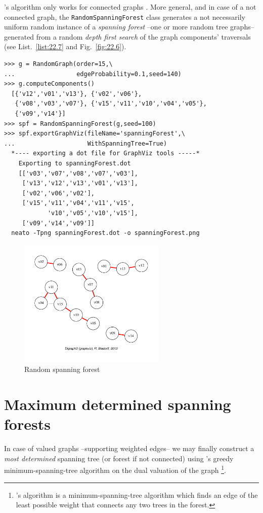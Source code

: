 \Wilson's algorithm only works for connected graphs \citep{WIL-1996}. More general, and in case of a not connected graph, the \texttt{RandomSpanningForest} class generates a not necessarily uniform random instance of a \emph{spanning forest} --one or more random tree graphs-- generated from a random \emph{depth first search} of the graph components' traversals (see List.~\vref{list:22.7} and Fig.~\vref{fig:22.6}).
\begin{lstlisting}[caption={Computing spanning forests over disconnected graphs. },label=list:22.7]
>>> g = RandomGraph(order=15,\
...                 edgeProbability=0.1,seed=140)
>>> g.computeComponents()
  [{'v12','v01','v13'}, {'v02','v06'},
   {'v08','v03','v07'}, {'v15','v11','v10','v04','v05'},
   {'v09','v14'}]
>>> spf = RandomSpanningForest(g,seed=100)
>>> spf.exportGraphViz(fileName='spanningForest',\
...                    WithSpanningTree=True)
  *---- exporting a dot file for GraphViz tools -----*
    Exporting to spanningForest.dot
    [['v03','v07','v08','v07','v03'],
     ['v13','v12','v13','v01','v13'],
     ['v02','v06','v02'],
     ['v15','v11','v04','v11','v15',
            'v10','v05','v10','v15'],
     ['v09','v14','v09']]
  neato -Tpng spanningForest.dot -o spanningForest.png
\end{lstlisting}
\begin{figure}[ht]
\sidecaption[t]
\includegraphics[width=7cm]{Figures/22-6-spanningForest.pdf}
\caption{Random spanning forest} 
\label{fig:22.6}       %
\end{figure}

\section{Maximum determined spanning forests}
\label{sec:22.3}

In case of valued graphs --supporting weighted edges-- we may finally construct a \emph{most determined} spanning tree (or forest if not connected) using \Kruskal's greedy minimum-spanning-tree algorithm on the dual valuation of the graph \citep{KRU-1956}\footnote{\Kruskal's algorithm is a minimum-spanning-tree algorithm which finds an edge of the least possible weight that connects any two trees in the forest.}.

